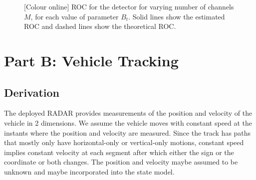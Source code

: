 \documentclass[11pt]{article}
\begin{document}
\begin{figure}[h]
\caption{[Colour online] ROC for the detector for varying number of channels $M$, for each value of parameter $B_{t}$. Solid lines show the estimated ROC and dashed lines show the theoretical ROC.}
\label{fig:ROCdexit}
\end{figure}

 
\clearpage
\section{Part B: Vehicle Tracking}
\label{sec:partA_Tracking}


\subsection{Derivation}
\label{subsec:partB_derivation}

The deployed RADAR provides measurements of the position and velocity of the vehicle in 2 dimensions. We assume the vehicle moves with constant speed at the instants where the position and velocity are measured. Since the track has paths that mostly only have horizontal-only or vertical-only motions, constant speed implies constant velocity at each segment after which either the sign or the coordinate or both changes. The position and velocity maybe assumed to be unknown and maybe incorporated into the state model.

\end{document}
